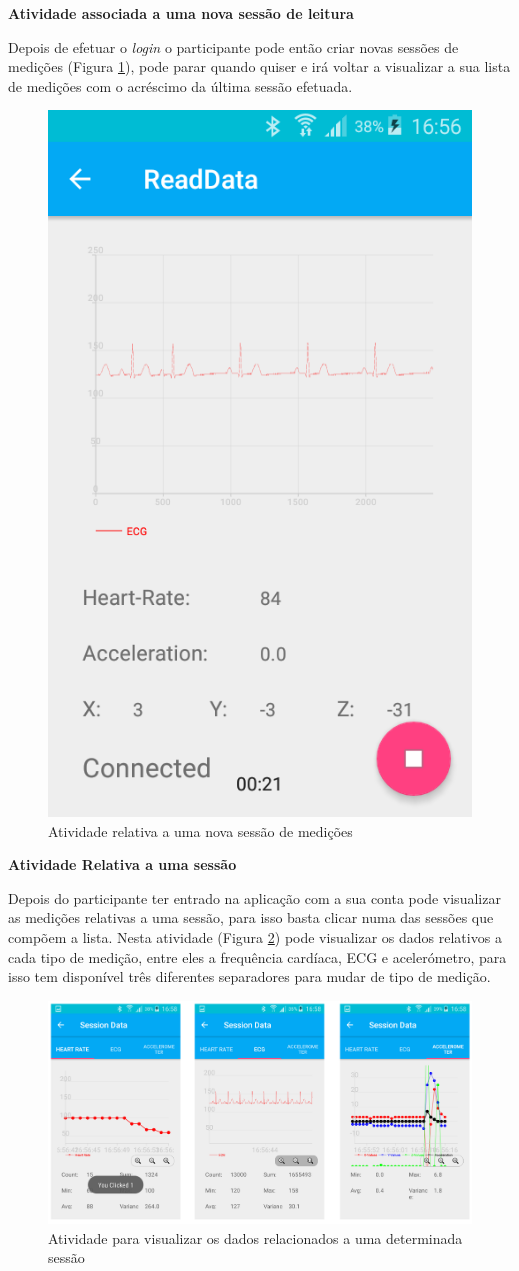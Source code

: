 \par
\textbf{Atividade associada a uma nova sessão de leitura}
\par
Depois de efetuar o \textit{login} o participante pode então criar novas sessões de medições (Figura \ref{f:onNewSession}), pode parar quando quiser e irá voltar a visualizar a sua lista de medições com o acréscimo da última sessão efetuada. 
\begin{figure}[H]
\centering
\includegraphics[height=0.3\textwidth]{imgs/reading.png}
\caption[Atividade relativa a uma nova sessão de medições]{Atividade relativa a uma nova sessão de medições}
\label{f:onNewSession}
\end{figure}

\par
\textbf{Atividade Relativa a uma sessão}
\par
Depois do participante ter entrado na aplicação com a sua conta pode visualizar as medições relativas a uma sessão, para isso basta clicar numa das sessões que compõem a lista. Nesta atividade (Figura \ref{f:read_data}) pode visualizar os dados relativos a cada tipo de medição, entre eles a frequência cardíaca, \gls{ECG} e acelerómetro, para isso tem disponível três diferentes separadores para mudar de tipo de medição. 
\begin{figure}[H]
\centering
\includegraphics[height=0.4\textwidth]{imgs/read_data.png}
\caption[Atividade para visualizar os dados relacionados a uma determinada sessão]{Atividade para visualizar os dados relacionados a uma determinada sessão}
\label{f:read_data}
\end{figure}

